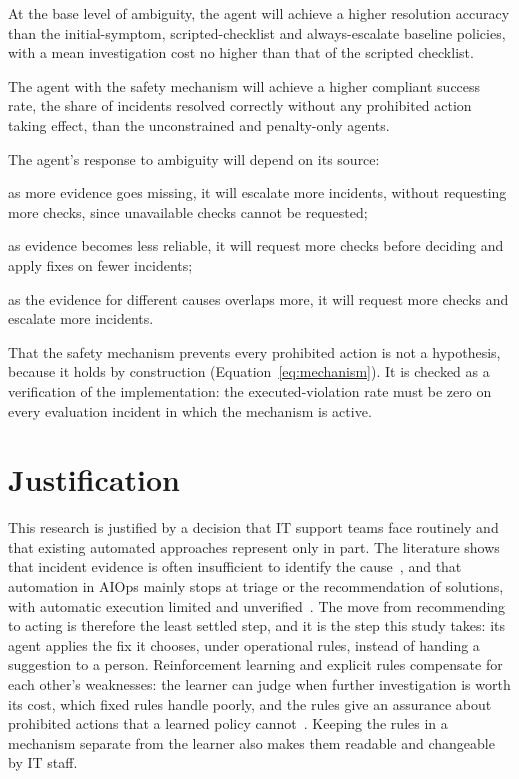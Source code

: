 \begin{description}[labelwidth=2.5em, leftmargin=3.2em, labelindent=0.5em]
\item[H1:] At the base level of ambiguity, the agent will achieve a higher resolution accuracy than the initial-symptom, scripted-checklist and always-escalate baseline policies, with a mean investigation cost no higher than that of the scripted checklist.
\item[H2:] The agent with the safety mechanism will achieve a higher compliant success rate, the share of incidents resolved correctly without any prohibited action taking effect, than the unconstrained and penalty-only agents.
\item[H3:] The agent's response to ambiguity will depend on its source:
\begin{description}[labelwidth=3.2em, leftmargin=3.6em]
\item[H3a:] as more evidence goes missing, it will escalate more incidents, without requesting more checks, since unavailable checks cannot be requested;
\item[H3b:] as evidence becomes less reliable, it will request more checks before deciding and apply fixes on fewer incidents;
\item[H3c:] as the evidence for different causes overlaps more, it will request more checks and escalate more incidents.
\end{description}
\end{description}

That the safety mechanism prevents every prohibited action is not a hypothesis, because it holds by construction (Equation~\eqref{eq:mechanism}). It is checked as a verification of the implementation: the executed-violation rate must be zero on every evaluation incident in which the mechanism is active.

\section{Justification}

This research is justified by a decision that IT support teams face routinely and that existing automated approaches represent only in part. The literature shows that incident evidence is often insufficient to identify the cause~\cite{chen2020}, and that automation in AIOps mainly stops at triage or the recommendation of solutions, with automatic execution limited and unverified~\cite{zhang2025}. The move from recommending to acting is therefore the least settled step, and it is the step this study takes: its agent applies the fix it chooses, under operational rules, instead of handing a suggestion to a person. Reinforcement learning and explicit rules compensate for each other's weaknesses: the learner can judge when further investigation is worth its cost, which fixed rules handle poorly, and the rules give an assurance about prohibited actions that a learned policy cannot~\cite{alshiekh2018}. Keeping the rules in a mechanism separate from the learner also makes them readable and changeable by IT staff.

